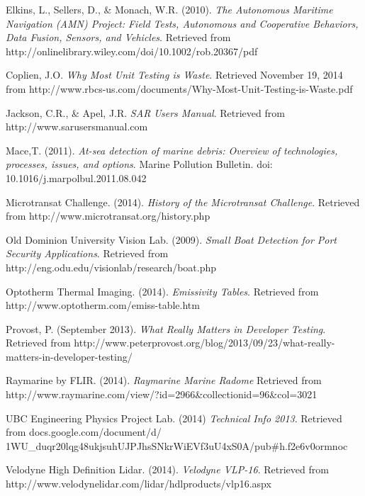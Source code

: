 \begin{thebibliography}{99}


 Elkins, L., Sellers, D., \& Monach, W.R. (2010). \textit{The Autonomous Maritime Navigation (AMN) Project: Field Tests, Autonomous and Cooperative Behaviors, Data Fusion, Sensors, and Vehicles}. Retrieved from http://onlinelibrary.wiley.com/doi/10.1002/rob.20367/pdf

 Coplien, J.O. \textit{Why Most Unit Testing is Waste}. Retrieved November 19, 2014 from http://www.rbcs-us.com/documents/Why-Most-Unit-Testing-is-Waste.pdf

 Jackson, C.R., \& Apel, J.R. \textit{SAR Users Manual}. Retrieved from http://www.sarusersmanual.com

 Mace,T. (2011). \textit{At-sea detection of marine debris: Overview of technologies, processes, issues, and options}. Marine Pollution Bulletin. doi: 10.1016/j.marpolbul.2011.08.042

 Microtransat Challenge. (2014). \textit{History of the Microtransat Challenge}. Retrieved from http://www.microtransat.org/history.php

 Old Dominion University Vision Lab. (2009). \textit{Small Boat Detection for Port Security Applications}. Retrieved from http://eng.odu.edu/visionlab/research/boat.php

 Optotherm Thermal Imaging. (2014). \textit{Emissivity Tables}. Retrieved from http://www.optotherm.com/emiss-table.htm

 Provost, P. (September 2013). \textit{What Really Matters in Developer Testing}. Retrieved from http://www.peterprovost.org/blog/2013/09/23/what-really-matters-in-developer-testing/

 Raymarine by FLIR. (2014). \textit{Raymarine Marine Radome} Retrieved from http://www.raymarine.com/view/?id=2966\&collectionid=96\&col=3021

 UBC Engineering Physics Project Lab. (2014) \textit{Technical Info 2013}. Retrieved from docs.google.com/document/d/\\1WU\_duqr20lqg48ukjsuhUJPJhsSNkrWiEVf3uU4xS0A/pub\#h.f2e6v0ormnoc

 Velodyne High Definition Lidar. (2014). \textit{Velodyne VLP-16}. Retrieved from http://www.velodynelidar.com/lidar/hdlproducts/vlp16.aspx

\end{thebibliography}